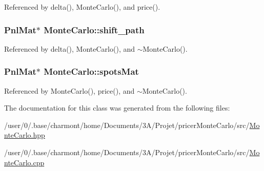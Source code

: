 Referenced by delta(), Monte\-Carlo(), and price().

\hypertarget{classMonteCarlo_a07755948492ef0832d5e131c1f010565}{
\subsubsection[{shift\-\_\-path}]{\setlength{\rightskip}{0pt plus 5cm}Pnl\-Mat$\ast$ Monte\-Carlo\-::shift\-\_\-path\hspace{0.3cm}{\ttfamily [private]}}}\label{classMonteCarlo_a07755948492ef0832d5e131c1f010565}


Referenced by delta(), Monte\-Carlo(), and $\sim$\-Monte\-Carlo().

\hypertarget{classMonteCarlo_a713c3dd7942f90fde1b0d9d115733580}{
\subsubsection[{spots\-Mat}]{\setlength{\rightskip}{0pt plus 5cm}Pnl\-Mat$\ast$ Monte\-Carlo\-::spots\-Mat\hspace{0.3cm}{\ttfamily [private]}}}\label{classMonteCarlo_a713c3dd7942f90fde1b0d9d115733580}


Referenced by Monte\-Carlo(), price(), and $\sim$\-Monte\-Carlo().



The documentation for this class was generated from the following files\-:\begin{DoxyCompactItemize}
\item 
/user/0/.\-base/charmont/home/\-Documents/3\-A/\-Projet/pricer\-Monte\-Carlo/src/\hyperlink{MonteCarlo_8hpp}{Monte\-Carlo.\-hpp}\item 
/user/0/.\-base/charmont/home/\-Documents/3\-A/\-Projet/pricer\-Monte\-Carlo/src/\hyperlink{MonteCarlo_8cpp}{Monte\-Carlo.\-cpp}\end{DoxyCompactItemize}
